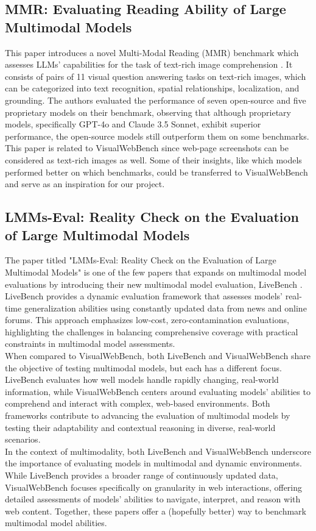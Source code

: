 \documentclass[11pt,a4paper]{article}
\begin{document}
\subsection*{MMR: Evaluating Reading Ability of Large Multimodal Models}

This paper introduces a novel Multi-Modal Reading (MMR) benchmark which assesses LLMs' capabilities for the task of text-rich image comprehension \cite{chen2024mmrevaluatingreadingability}. It consists of pairs of 11 visual question answering tasks on text-rich images, which can be categorized into text recognition, spatial relationships, localization, and grounding. The authors evaluated the performance of seven open-source and five proprietary models on their benchmark, observing that although proprietary models, specifically GPT-4o and Claude 3.5 Sonnet, exhibit superior performance, the open-source models still outperform them on some benchmarks. This paper is related to VisualWebBench since web-page screenshots can be considered as text-rich images as well. Some of their insights, like which models performed better on which benchmarks, could be transferred to VisualWebBench and serve as an inspiration for our project.


\subsection*{LMMs-Eval: Reality Check on the Evaluation of Large Multimodal Models}
The paper titled "LMMs-Eval: Reality Check on the Evaluation of Large Multimodal Models" is one of the few papers that expands on multimodal model evaluations by introducing their new multimodal model evaluation, LiveBench \cite{zhang2024lmmsevalrealitycheckevaluation}. LiveBench provides a dynamic evaluation framework that assesses models' real-time generalization abilities using constantly updated data from news and online forums. This approach emphasizes low-cost, zero-contamination evaluations, highlighting the challenges in balancing comprehensive coverage with practical constraints in multimodal model assessments.\\
When compared to VisualWebBench, both LiveBench and VisualWebBench share the objective of testing multimodal models, but each has a different focus. LiveBench evaluates how well models handle rapidly changing, real-world information, while VisualWebBench centers around evaluating models’ abilities to comprehend and interact with complex, web-based environments. Both frameworks contribute to advancing the evaluation of multimodal models by testing their adaptability and contextual reasoning in diverse, real-world scenarios. \\
In the context of multimodality, both LiveBench and VisualWebBench underscore the importance of evaluating models in multimodal and dynamic environments. While LiveBench provides a broader range of continuously updated data, VisualWebBench focuses specifically on granularity in web interactions, offering detailed assessments of models' abilities to navigate, interpret, and reason with web content. Together, these papers offer a (hopefully better) way to benchmark multimodal model abilities.
\end{document}
